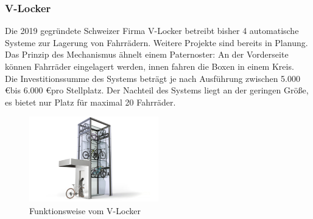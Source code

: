 \subsubsection{V-Locker}
Die 2019 gegründete Schweizer Firma V-Locker betreibt bisher 4 automatische Systeme zur Lagerung von Fahrrädern.  Weitere Projekte sind bereits in Planung. \\
Das Prinzip des Mechanismus ähnelt einem Paternoster: An der Vorderseite können Fahrräder eingelagert werden, innen fahren die Boxen in einem Kreis.\\
Die Investitionssumme des Systems beträgt je nach Ausführung zwischen 5.000 \euro bis 6.000 \euro pro Stellplatz.  Der Nachteil des Systems liegt an der geringen Größe, es bietet nur Platz für maximal 20 Fahrräder.\\

\begin{figure}[H]
    \centering
    \includegraphics[width=0.5\textwidth]{images/vlocker.png}
    \caption{Funktionsweise vom V-Locker }
    \label{fig:vlocker}
\end{figure}
